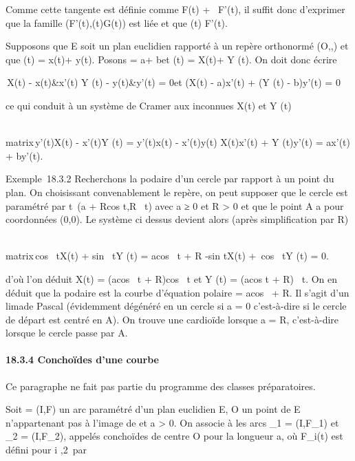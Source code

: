 \documentclass[]{article}
\begin{document}
Comme cette tangente est définie comme F(t) + ~F'(t), il suffit donc
d'exprimer que la famille
(F'(t),\overrightarrowF(t)G(t)) est liée et que
\overrightarrowAG(t) \bot F'(t).

Supposons que E soit un plan euclidien rapporté à un repère orthonormé
(O,\vec\imath,) et que
\overrightarrowOF(t) = x(t)\vec\imath +
y(t). Posons
\overrightarrowOA = a\vec\imath +
b et \overrightarrowOG(t) =
X(t)\vec\imath + Y (t). On doit
donc écrire

\left
\matrix\,X(t) - x(t)&x'(t)
\cr Y (t) - y(t)&y'(t)\right 
= 0\text et (X(t) - a)x'(t) + (Y (t) - b)y'(t) = 0

ce qui conduit à un système de Cramer aux inconnues X(t) et Y (t)

\left
\\matrix\,y'(t)X(t) -
x'(t)Y (t) = y'(t)x(t) - x'(t)y(t) \cr X(t)x'(t) + Y
(t)y'(t) = ax'(t) + by'(t)\right .

Exemple~18.3.2 Recherchons la podaire d'un cercle par rapport à un point
du plan. On choisissant convenablement le repère, on peut supposer que
le cercle est paramétré par t\mapsto~(a +
Rcos t,R\sin~ t) avec
a ≥ 0 et R \textgreater{} 0 et que le point A a pour coordonnées (0,0).
Le système ci dessus devient alors (après simplification par R)

\left
\\matrix\,cos~
tX(t) + sin~ tY (t) =
acos~ t + R \cr
-sin tX(t) +\ cos~ tY
(t) = 0\right .

d'où l'on déduit X(t) = (acos~ t +
R)cos~ t et Y (t) =
(acos t + R)\sin~ t.
On en déduit que la podaire est la courbe d'équation polaire \rho =
acos~ \theta + R. Il s'agit d'un
lima\ccon de Pascal (évidemment dégénéré en un cercle
si a = 0 c'est-à-dire si le cercle de départ est centré en A). On trouve
une cardioïde lorsque a = R, c'est-à-dire lorsque le cercle passe par A.

\paragraph{18.3.4 Conchoïdes d'une courbe}

Ce paragraphe ne fait pas partie du programme des classes préparatoires.

Soit \Gamma = (I,F) un arc paramétré d'un plan euclidien E, O un point de E
n'appartenant pas à l'image de \Gamma et a \textgreater{} 0. On associe à \Gamma
les arcs \Gamma_1 = (I,F_1) et \Gamma_2 =
(I,F_2), appelés conchoïdes de centre O pour la longueur a, où
F_i(t) est défini pour i
\in\1,2\ par
\end{document}
